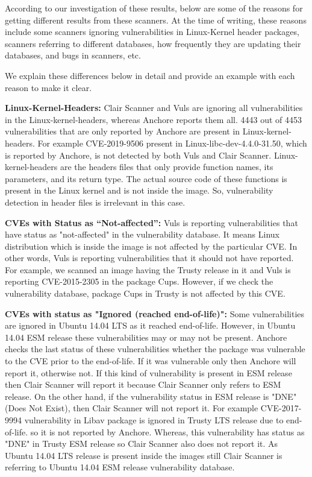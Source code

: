 \documentclass[a4paper,num-refs]{oup-contemporary}
\begin{document}
According to our investigation of these results, below are some of the reasons for
getting different results from these scanners. At the time of writing, these reasons include
some scanners ignoring vulnerabilities in Linux-Kernel header packages, scanners referring to different databases,
how frequently they are updating their databases, and bugs in scanners, etc. 

We explain these differences below in detail
and provide an example with each reason to make it clear.

\textbf{Linux-Kernel-Headers:} Clair Scanner and Vuls are ignoring all vulnerabilities in the Linux-kernel-headers,
whereas Anchore reports them all.
4443 out of 4453 vulnerabilities that are only reported by Anchore are present in Linux-kernel-headers.
For example CVE-2019-9506 present in Linux-libc-dev-4.4.0-31.50, which is reported by Anchore, is not
detected by both Vuls and Clair Scanner.
Linux-kernel-headers are the headers files that only provide function names, its parameters, and its
return type.
The actual source code of these functions is present in the Linux kernel and is not inside the image.
So, vulnerability detection in header files
is irrelevant in this case.

\textbf{CVEs with Status as “Not-affected”:} Vuls is reporting vulnerabilities that have status
as "not-affected" in the vulnerability database. It means Linux distribution which is inside the image is not affected
by the particular CVE. In other words, Vuls is reporting vulnerabilities that it should not have reported.
For example, we scanned an image having the Trusty release in it and Vuls is reporting CVE-2015-2305
in the package Cups. However, if we check the vulnerability database, package Cups in Trusty is not
affected by this CVE.

\textbf{CVEs with status as "Ignored (reached end-of-life)":}
Some vulnerabilities are ignored in Ubuntu 14.04 LTS as it reached end-of-life. 
However, in Ubuntu 14.04 ESM release these vulnerabilities may or may not be present.
Anchore checks the last status of these vulnerabilities whether the package was vulnerable to the CVE
prior to the end-of-life. If it was vulnerable only then Anchore will report it, otherwise not.
If this kind of vulnerability is present in ESM release then Clair Scanner will report it because Clair Scanner
only refers to ESM release. On the other hand, if the vulnerability
status in ESM release is "DNE" (Does Not Exist), then Clair Scanner will not report it. 
For example CVE-2017-9994 vulnerability in Libav package is ignored in Trusty LTS release due to end-of-life.
so it is not reported by Anchore. Whereas, this vulnerability has status as "DNE" in Trusty ESM
release so Clair Scanner also does not report it. As Ubuntu 14.04 LTS release is present inside the images still
Clair Scanner is referring to Ubuntu 14.04 ESM release vulnerability database.
\end{document}
